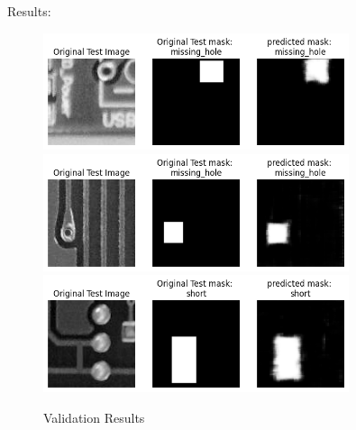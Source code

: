 \documentclass[12pt]{article}
\begin{document}
Results:
\begin{figure}[h]
    \centering
    \includegraphics[width=0.8\textwidth]{./graphics/output1.png}
    \includegraphics[width=0.8\textwidth]{./graphics/output2.png}
    \includegraphics[width=0.8\textwidth]{./graphics/output3.png}

    \caption{Validation Results}
    \label{fig:results}
\end{figure}
\end{document}

